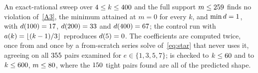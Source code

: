 \begin{remark}
\label{rem:machine-local}
An exact-rational sweep over $4 \le k \le 400$ and the full support
$m \le 259$ finds no violation of~\ref{A3}, the minimum attained at
$m = 0$ for every $k$, and $\min d = 1$, with $d(100) =
17$, $d(200) = 33$ and
$d(400) = 67$; the control run with
$a(k) = \lfloor (k-1)/3 \rfloor$ reproduces $d(5) = 0$. The
coefficients are computed twice, once from  and once
by a from-scratch series solve of~\eqref{eq:star} that never uses it,
agreeing on all $355$ pairs examined for $e \in \{1,3,5,7\}$;
 is checked to $k \le 60$ and  to
$k \le 600$, $m \le 80$, where the $150$ tight
pairs found are all of the predicted shape.
\end{remark}
